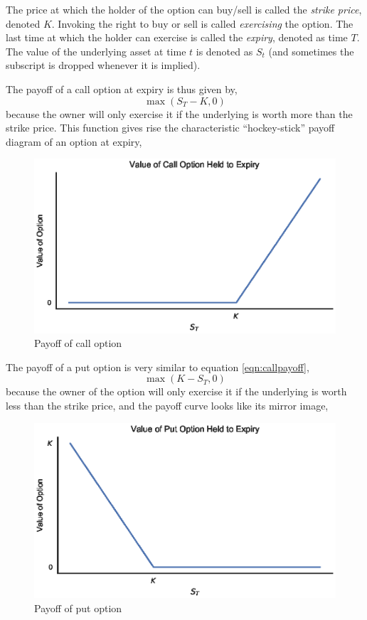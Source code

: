 \documentclass[12pt]{article}
\numberwithin{equation}{section}
\begin{document}
The price at which the holder of the option can buy/sell is called the
\emph{strike price}, denoted $K$. Invoking the right to buy or sell is called
\emph{exercising} the option. The last time at which the holder can exercise is
called the \emph{expiry}, denoted as time $T$. The value of the underlying asset
at time $t$ is denoted as $S_t$ (and sometimes the subscript is dropped whenever
it is implied). 

The payoff of a call option at expiry is thus given by,
\begin{equation}
 \max(S_T - K, 0) 
\label{eqn:callpayoff}
\end{equation}
because the owner will only exercise it if the underlying is worth more than the
strike price. This function gives rise the characteristic ``hockey-stick''
payoff diagram of an option at expiry,

\begin{figure}[h]
\centering
\includegraphics{figs/calloptpayoff}
\caption{Payoff of call option}
\label{fig:calloptpayoff}
\end{figure}


The payoff of a put option is very similar to equation \ref{eqn:callpayoff},
\begin{equation}
 \max(K-S_T, 0) 
\end{equation}
because the owner of the option will only exercise it if the underlying is worth
less than the strike price, 
and the payoff curve looks like its mirror image,

\begin{figure}[h]
\centering
\includegraphics{figs/putoptpayoff}
\caption{Payoff of put option}
\label{fig:putoptpayoff}
\end{figure}
\end{document}
